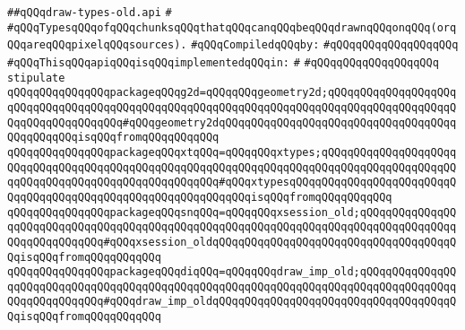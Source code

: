 \label{src/lib/x-kit/xclient/src/window/draw-types-old.api}
\verb|##qQQqdraw-types-old.api|\newline
\verb|#|\newline
\verb|#qQQqTypesqQQqofqQQqchunksqQQqthatqQQqcanqQQqbeqQQqdrawnqQQqonqQQq(orqQQqareqQQqpixelqQQqsources).|\newline
\newline
\verb|#qQQqCompiledqQQqby:|\newline
\verb|#qQQqqQQqqQQqqQQqqQQq|\newline
\newline
\verb|#qQQqThisqQQqapiqQQqisqQQqimplementedqQQqin:|\newline
\verb|#|\newline
\verb|#qQQqqQQqqQQqqQQqqQQq|\newline
\newline
\verb|stipulate|\newline
\verb|qQQqqQQqqQQqqQQqpackageqQQqg2d=qQQqqQQqgeometry2d;qQQqqQQqqQQqqQQqqQQqqQQqqQQqqQQqqQQqqQQqqQQqqQQqqQQqqQQqqQQqqQQqqQQqqQQqqQQqqQQqqQQqqQQqqQQqqQQqqQQqqQQqqQQq#qQQqgeometry2dqQQqqQQqqQQqqQQqqQQqqQQqqQQqqQQqqQQqqQQqqQQqqQQqisqQQqfromqQQqqQQqqQQq|\newline
\verb|qQQqqQQqqQQqqQQqpackageqQQqxtqQQq=qQQqqQQqxtypes;qQQqqQQqqQQqqQQqqQQqqQQqqQQqqQQqqQQqqQQqqQQqqQQqqQQqqQQqqQQqqQQqqQQqqQQqqQQqqQQqqQQqqQQqqQQqqQQqqQQqqQQqqQQqqQQqqQQqqQQqqQQq#qQQqxtypesqQQqqQQqqQQqqQQqqQQqqQQqqQQqqQQqqQQqqQQqqQQqqQQqqQQqqQQqqQQqqQQqisqQQqfromqQQqqQQqqQQq|\newline
\verb|qQQqqQQqqQQqqQQqpackageqQQqsnqQQq=qQQqqQQqxsession_old;qQQqqQQqqQQqqQQqqQQqqQQqqQQqqQQqqQQqqQQqqQQqqQQqqQQqqQQqqQQqqQQqqQQqqQQqqQQqqQQqqQQqqQQqqQQqqQQqqQQq#qQQqxsession_oldqQQqqQQqqQQqqQQqqQQqqQQqqQQqqQQqqQQqqQQqisqQQqfromqQQqqQQqqQQq|\newline
\verb|qQQqqQQqqQQqqQQqpackageqQQqdiqQQq=qQQqqQQqdraw_imp_old;qQQqqQQqqQQqqQQqqQQqqQQqqQQqqQQqqQQqqQQqqQQqqQQqqQQqqQQqqQQqqQQqqQQqqQQqqQQqqQQqqQQqqQQqqQQqqQQqqQQq#qQQqdraw_imp_oldqQQqqQQqqQQqqQQqqQQqqQQqqQQqqQQqqQQqqQQqisqQQqfromqQQqqQQqqQQq|\newline
